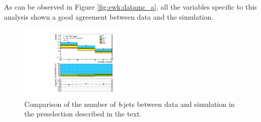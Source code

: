 As can be observed in Figure \ref{fig:ewk:datamc_a}, all the variables specific to this analysis shown a good 
agreement between data and the simulation. 

\begin{figure}[htbp]
\centering 
\includegraphics[width=0.45\textwidth]{figures/ewk_prod/data_mc/0L_3bin/data_mc_bjets_n.pdf}
\caption{Comparison of the number of \textit{b}-jets between data and simulation in the preselection described in the text.
}
\label{fig:ewk:datamc_bjets}
\end{figure}

